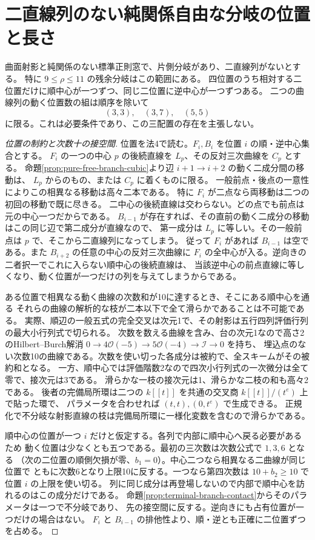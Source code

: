 \section{二直線列のない純関係自由な分岐の位置と長さ}
\label{sec:branch-centers-opposite-phases}
\begin{theorem}\label{thm:branch-centers-opposite-phases}
曲面射影と純関係のない標準正則窓で、片側分岐があり、二直線列がないとする。
特に $9\le\rho\le11$ の残余分岐はこの範囲にある。
四位置のうち相対する二位置だけに順中心が一つずつ、同じ二位置に逆中心が一つずつある。
二つの曲線列の動く位置数の組は順序を除いて
\[
                           (3,3),\quad(3,7),\quad(5,5)
\]
に限る。これは必要条件であり、この三配置の存在を主張しない。
\end{theorem}
\begin{proof}[位置の制約と次数十の接空間]
位置を法4で読む。$F_i,B_i$ を位置 $i$ の順・逆中心集合とする。
$F_i$ の一つの中心 $p$ の後続直線を $L_p$、その反対三次曲線を $C_p$ とする。
命題\ref{prop:pure-free-branch-cubic}より辺 $i+1\to i+2$ の動く二成分間の移動は、
$L_p$ からのもの、または $C_p$ に着くものに限る。
一般前点・後点の一意性によりこの相異なる移動は高々二本である。
特に $F_i$ が二点なら両移動は二つの初回の移動で既に尽きる。
二中心の後続直線は交わらない。どの点でも前点は元の中心一つだからである。
$B_{i-1}$ が存在すれば、その直前の動く二成分の移動はこの同じ辺で第二成分が直線なので、
第一成分は $L_p$ に等しい。その一般前点は $p$ で、そこから二直線列になってしまう。
従って $F_i$ があれば $B_{i-1}$ は空である。また $B_{i+2}$ の任意の中心の反対三次曲線に
$F_i$ の全中心が入る。逆向きの二者択一でこれに入らない順中心の後続直線は、
当該逆中心の前点直線に等しくなり、動く位置が一つだけの列を与えてしまうからである。

ある位置で相異なる動く曲線の次数和が10に達するとき、そこにある順中心を通る
それらの曲線の解析的な枝が二本以下で全て滑らかであることは不可能である。
実際、順辺の一般五式の完全交叉は次元1で、その射影は五行四列評価行列の最大小行列式で切られる。
次数を数える曲線を含み、台の次元1なので高さ2のHilbert--Burch解消
$0\to4\mathcal O(-5)\to5\mathcal O(-4)\to\mathcal I\to0$ を持ち、
埋込点のない次数10の曲線である。次数を使い切った各成分は被約で、全スキームがその被約和となる。
一方、順中心では評価階数2なので四次小行列式の一次微分は全て零で、接次元は3である。
滑らかな一枝の接次元は1、滑らかな二枝の和も高々2である。
後者の完備局所環は二つの $k[[t]]$ を共通の交叉商 $k[[t]]/(t^e)$ 上で貼った環で、
パラメータを合わせれば $(t,t),(0,t^e)$ で生成できる。
正規化で不分岐な射影直線の枝は完備局所環に一様化変数を含むので滑らかである。

順中心の位置が一つ $i$ だけと仮定する。各列で内部に順中心へ戻る必要があるため
動く位置は少なくとも五つである。最初の三次数は次数公式で $1,3,6$ となる
（次の二位置の順側欠損が零、$b_1=0$）。中心二つなら相異なる二曲線が同じ位置で
ともに次数6となり上限10に反する。一つなら第四次数は $10+b_2\ge10$ で位置 $i$ の上限を使い切る。
列に同じ成分は再登場しないので内部で順中心を訪れるのはこの成分だけである。
命題\ref{prop:terminal-branch-contact}からそのパラメータは一つで不分岐であり、
先の接空間に反する。逆向きにも占有位置が一つだけの場合はない。
$F_i$ と $B_{i-1}$ の排他性より、順・逆とも正確に二位置ずつを占める。

\end{proof}
